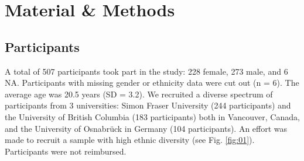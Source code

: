 \documentclass{frontiersSCNS} %
\begin{document}
\section{Material \& Methods}

\subsection{Participants}
A total of 507 participants took part in the study: 228 female, 273 male, and 6 NA. Participants with missing gender or ethnicity data were cut out (n = 6). The average age was 20.5 years (SD = 3.2). We recruited a diverse spectrum of participants from 3 universities: Simon Fraser University (244 participants) and the University of British Columbia (183 participants) both in Vancouver, Canada, and the University of Osnabr\"uck in Germany (104 participants). An effort was made to recruit a sample with high ethnic diversity (see Fig. \ref{fig:01}). Participants were not reimbursed.
\end{document}
